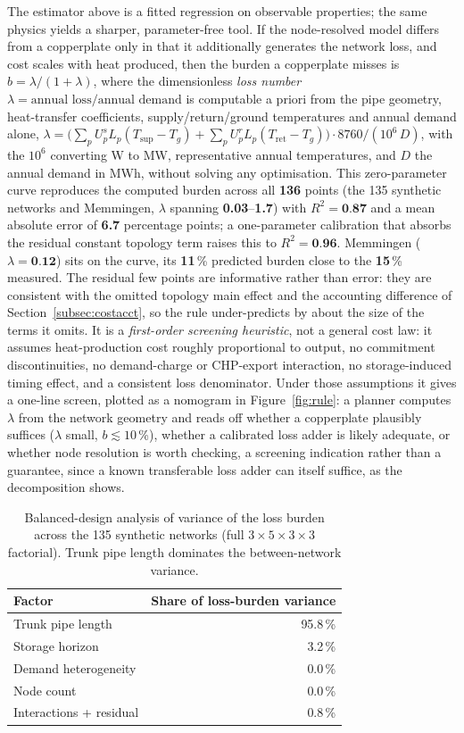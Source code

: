 \documentclass[a4paper,fleqn]{cas-sc}
\begin{document}
The estimator above is a fitted regression on observable properties; the same physics yields a
sharper, parameter-free tool. If the node-resolved model differs from a copperplate only in that
it additionally generates the network loss, and cost scales with heat produced, then the burden a
copperplate misses is $b=\lambda/(1+\lambda)$, where the dimensionless \emph{loss number}
$\lambda=\text{annual loss}/\text{annual demand}$ is computable a priori from the pipe geometry, heat-transfer coefficients, supply/return/ground temperatures and annual demand
alone, $\lambda=\big(\sum_p U^{s}_p L_p (T_{\text{sup}}-T_g)+\sum_p U^{r}_p L_p
(T_{\text{ret}}-T_g)\big)\cdot 8760/(10^{6}\,D)$, with the $10^{6}$ converting W to MW,
representative annual temperatures, and $D$ the annual demand in MWh, without solving any
optimisation. This
zero-parameter curve reproduces the computed burden across all \textbf{136} points (the
135 synthetic networks and Memmingen, $\lambda$ spanning
\textbf{0.03}--\textbf{1.7}) with $R^2=\textbf{0.87}$ and a mean
absolute error of \textbf{6.7} percentage points; a one-parameter calibration that
absorbs the residual constant topology term raises this to $R^2=\textbf{0.96}$. Memmingen
($\lambda=\textbf{0.12}$) sits on the curve, its \textbf{11}\,\% predicted
burden close to the \textbf{15}\,\% measured. The residual few points are
informative rather than error: they are consistent with the omitted topology main effect and the
accounting difference of Section~\ref{subsec:costacct}, so the rule under-predicts by about the
size of the terms it omits. It is a \emph{first-order screening heuristic}, not a general cost
law: it assumes heat-production cost roughly proportional to output, no commitment
discontinuities, no demand-charge or CHP-export interaction, no storage-induced timing effect,
and a consistent loss denominator. Under those assumptions it gives a one-line screen, plotted
as a nomogram in Figure~\ref{fig:rule}: a planner computes $\lambda$ from the network geometry
and reads off whether a copperplate plausibly suffices ($\lambda$ small, $b\lesssim10$\,\%),
whether a calibrated loss adder is likely adequate, or whether node resolution is worth
checking, a screening indication rather than a guarantee, since a known transferable loss
adder can itself suffice, as the decomposition shows.
\begin{table}[t]
\centering
\caption{Balanced-design analysis of variance of the loss burden across the 135 synthetic
networks (full $3\times5\times3\times3$ factorial). Trunk pipe length dominates the
between-network variance.}
\label{tab:synthanova}
\begin{tabular}{lr}
\hline
Factor & Share of loss-burden variance \\
\hline
Trunk pipe length & 95.8\,\% \\
Storage horizon & 3.2\,\% \\
Demand heterogeneity & 0.0\,\% \\
Node count & 0.0\,\% \\
Interactions + residual & 0.8\,\% \\
\hline
\end{tabular}
\end{table}
\end{document}
